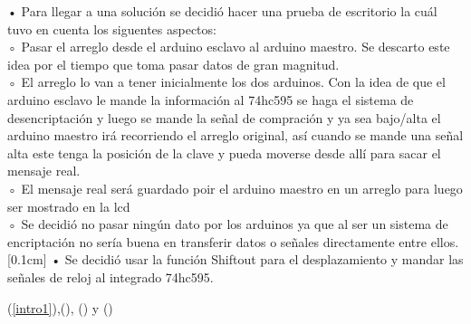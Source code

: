 \documentclass{article}
\begin{document}
\begin{flushleft}
    • Para llegar a una solución se decidió hacer una prueba de escritorio la cuál tuvo en cuenta los siguentes aspectos: \\[0.1cm]
        ◦ Pasar el arreglo desde el arduino esclavo al arduino maestro. Se descarto este idea por el tiempo que toma pasar datos de gran magnitud.\\[0.1cm]
        ◦ El arreglo lo van a tener inicialmente los dos arduinos. Con la idea de que el arduino esclavo le mande la información al 74hc595 se haga el sistema de desencriptación y luego se mande la señal de compración y ya sea bajo/alta el arduino maestro irá recorriendo el arreglo original, así cuando se mande una señal alta este tenga la posición de la clave y pueda moverse desde allí para sacar el mensaje real.\\[0.1cm]
         ◦ El mensaje real será guardado poir el arduino maestro en un arreglo para luego ser mostrado en la lcd\\[0.1cm]
         ◦ Se decidió no pasar ningún dato por los arduinos ya que al ser un sistema de encriptación no sería buena en transferir datos o señales directamente entre ellos.[0.1cm]
    • Se decidió usar la función Shiftout para el desplazamiento y mandar las señales de reloj al integrado 74hc595. \\[0.1cm]
\end{flushleft}





(\ref{intro1}),(\label{intro2}), (\label{investigación}) y  (\label{practica})


\end{document}

